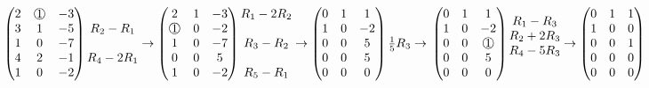 \documentclass[12pt]{article}
\newcommand*{\mcirc}[1]{\text{\raisebox{.5pt}{\textcircled{\raisebox{-.9pt} {#1}}}}}
\begin{document}
$\begin{pmatrix}
    2 & \mcirc{1} & -3 \\
    3 & 1 & -5 \\
    1 & 0 & -7 \\
    4 & 2 & -1 \\
    1 & 0 & -2
\end{pmatrix} \begin{matrix}
    \\
    R_2 - R_1 \\
    \\
    R_4 - 2R_1 \\
    \\
\end{matrix} \to \begin{pmatrix}
    2 & 1 & -3 \\
    \mcirc{1} & 0 & -2 \\
    1 & 0 & -7 \\
    0 & 0 &  5 \\
    1 & 0 & -2
\end{pmatrix} \begin{matrix}
    R_1 - 2R_2 \\
    \\
    R_3 - R_2 \\
    \\
    R_5 - R_1 \\
\end{matrix} \to \begin{pmatrix}
    0 & 1 &  1 \\
    1 & 0 & -2 \\
    0 & 0 &  5 \\
    0 & 0 &  5 \\
    0 & 0 &  0
\end{pmatrix} \frac{1}{5} R_3 \to \\\\\\
\begin{pmatrix}
    0 & 1 &  1 \\
    1 & 0 & -2 \\
    0 & 0 &  \mcirc{1} \\
    0 & 0 &  5 \\
    0 & 0 &  0
\end{pmatrix} \begin{matrix}
    R_1 - R_3 \\
    R_2 + 2R_3
    \\
    R_4 - 5R_3\\
    \\
\end{matrix} \to \begin{pmatrix}
    0 & 1 &  1 \\
    1 & 0 &  0 \\
    0 & 0 &  1 \\
    0 & 0 &  0 \\
    0 & 0 &  0
\end{pmatrix}$ \\\\
\end{document}
